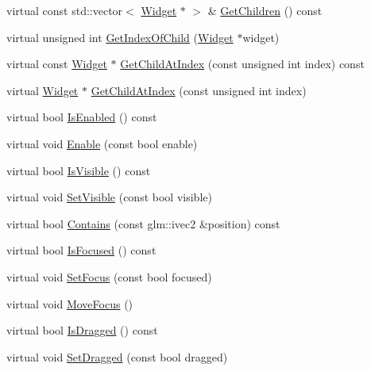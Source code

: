 \begin{DoxyCompactItemize}
\item 
virtual const std\+::vector$<$ \mbox{\hyperlink{classec__gui_1_1_widget}{Widget}} $\ast$ $>$ \& \mbox{\hyperlink{classec__gui_1_1_widget_ab26607bf3de0ceae841e41945ab8f9e4}{Get\+Children}} () const
\item 
virtual unsigned int \mbox{\hyperlink{classec__gui_1_1_widget_ad06951045ad2a3264e833fa45268be3b}{Get\+Index\+Of\+Child}} (\mbox{\hyperlink{classec__gui_1_1_widget}{Widget}} $\ast$widget)
\item 
virtual const \mbox{\hyperlink{classec__gui_1_1_widget}{Widget}} $\ast$ \mbox{\hyperlink{classec__gui_1_1_widget_ae001f8e501302223bacc08ece749d83e}{Get\+Child\+At\+Index}} (const unsigned int index) const
\item 
virtual \mbox{\hyperlink{classec__gui_1_1_widget}{Widget}} $\ast$ \mbox{\hyperlink{classec__gui_1_1_widget_acf322b4d06d7700ed53fe1e58b77ef1c}{Get\+Child\+At\+Index}} (const unsigned int index)
\item 
virtual bool \mbox{\hyperlink{classec__gui_1_1_widget_aefeb92da89ceeab8c325c608f5f94eda}{Is\+Enabled}} () const
\item 
virtual void \mbox{\hyperlink{classec__gui_1_1_widget_ab75853fb9f30f9c4045a353098c75272}{Enable}} (const bool enable)
\item 
virtual bool \mbox{\hyperlink{classec__gui_1_1_widget_aa1c395de02636920d676a32f1bd8e4c7}{Is\+Visible}} () const
\item 
virtual void \mbox{\hyperlink{classec__gui_1_1_widget_af8deabeac22eef4678abe51317e0e3d1}{Set\+Visible}} (const bool visible)
\item 
virtual bool \mbox{\hyperlink{classec__gui_1_1_widget_a61c3184d7fddb724bcf4a956a3f0e662}{Contains}} (const glm\+::ivec2 \&position) const
\item 
virtual bool \mbox{\hyperlink{classec__gui_1_1_widget_a041f7c22a8bb0f2f148fcb4ede3a82cc}{Is\+Focused}} () const
\item 
virtual void \mbox{\hyperlink{classec__gui_1_1_widget_a208e6552a2ca90a54484ba68fa038599}{Set\+Focus}} (const bool focused)
\item 
virtual void \mbox{\hyperlink{classec__gui_1_1_widget_a4cef77dd2f523b09bb771e245c285ca8}{Move\+Focus}} ()
\item 
virtual bool \mbox{\hyperlink{classec__gui_1_1_widget_a7af5d283ca8653dfbc1d701be8bf4576}{Is\+Dragged}} () const
\item 
virtual void \mbox{\hyperlink{classec__gui_1_1_widget_ad9f31a52bf63294eb6c5cb260934bbfb}{Set\+Dragged}} (const bool dragged)

\end{DoxyCompactItemize}
